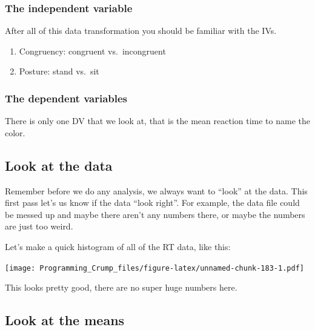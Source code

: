\documentclass[]{book}
\newenvironment{Shaded}{\begin{snugshade}}{\end{snugshade}}
\newcommand{\KeywordTok}[1]{\textcolor[rgb]{0.13,0.29,0.53}{\textbf{{#1}}}}
\newcommand{\NormalTok}[1]{{#1}}
\providecommand{\tightlist}{%
  \setlength{\itemsep}{0pt}\setlength{\parskip}{0pt}}
\theoremstyle{definition}
\theoremstyle{definition}
\theoremstyle{definition}
\theoremstyle{remark}
\begin{document}
\subsubsection{The independent
variable}\label{the-independent-variable-2}

After all of this data transformation you should be familiar with the
IVs.

\begin{enumerate}
\def\labelenumi{\arabic{enumi}.}
\tightlist
\item
  Congruency: congruent vs.~incongruent
\item
  Posture: stand vs.~sit
\end{enumerate}

\subsubsection{The dependent variables}\label{the-dependent-variables-1}

There is only one DV that we look at, that is the mean reaction time to
name the color.

\subsection{Look at the data}\label{look-at-the-data-4}

Remember before we do any analysis, we always want to ``look'' at the
data. This first pass let's us know if the data ``look right''. For
example, the data file could be messed up and maybe there aren't any
numbers there, or maybe the numbers are just too weird.

Let's make a quick histogram of all of the RT data, like this:

\begin{Shaded}
\end{Shaded}

\texttt{[image: Programming\_Crump\_files/figure-latex/unnamed-chunk-183-1.pdf]}

This looks pretty good, there are no super huge numbers here.

\subsection{Look at the means}\label{look-at-the-means-1}
\end{document}
